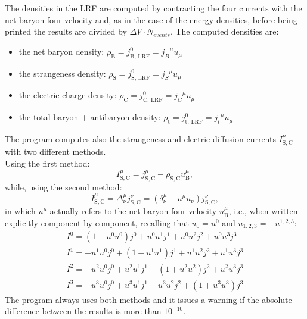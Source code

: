 \documentclass[12pt, a4paper]{article}
\begin{document}
The densities in the LRF are computed by contracting the four currents with the net baryon four-velocity and, as in the case of the energy densities, before being printed the results are divided by $\Delta V \cdot N_{events}$. The computed densities are:
\begin{itemize}
	\item the net baryon density: $\rho_{\mathrm{B}} = j_{\mathrm{B,\,LRF}}^{0}={j_{B}}^{\mu}u_{\mu}$
    \item the strangeness density: $\rho_{\mathrm{S}} = j_{\mathrm{S,\,LRF}}^{0}={j_{S}}^{\mu}u_{\mu}$
    \item the electric charge density: $\rho_{\mathrm{C}} = j_{\mathrm{C,\,LRF}}^{0}={j_{C}}^{\mu}u_{\mu}$
    \item the total baryon + antibaryon density: $\rho_{\mathrm{t}} = j_{\mathrm{t,\,LRF}}^{0}={j_{t}}^{\mu}u_{\mu}$  
\end{itemize}
The program computes also the strangeness and electric diffusion currents $I_{\mathrm{S,C}}^{\mu}$ with two different methods.\\
Using the first method:
\begin{equation}
I_{\mathrm{S,C}}^{\mu}=j_{\mathrm{S,C}}^{\mu}-\rho_{\mathrm{S,C}} u_{\mathrm{B}}^{\mu},
\label{eq:diff_current_eckart_I}
\end{equation}
while, using the second method:
\begin{equation}
I_{\mathrm{S,C}}^{\mu}=\Delta^{\mu}_{\nu}j_{\mathrm{S,C}}^{\nu}=(\delta^{\mu}_{\nu}-u^{\mu}u_{\nu})j_{\mathrm{S,C}}^{\nu},
\label{eq:diff_current_eckart_II}
\end{equation}
in which $u^{\mu}$ actually refers to the net baryon four velocity $u^{\mu}_{\mathrm{B}}$, i.e., when written explicitly component by component, recalling that $u_0=u^0$ and $u_{1,2,3}=-u^{1,2,3}$:
\begin{equation}
\begin{split}
I^0=(1-u^0 u^0)j^0+u^0u^1j^1+u^0u^2j^2+u^0u^3j^3\\
I^1=-u^1 u^0j^0+(1+u^1u^1)j^1+u^1u^2j^2+u^1u^3j^3\\
I^2=-u^2 u^0j^0+u^2u^1j^1+(1+u^2u^2)j^2+u^2u^3j^3\\
I^3=-u^3 u^0j^0+u^3u^1j^1+u^3u^2j^2+(1+u^3u^3)j^3
\end{split}
\label{eq:diff_current_eckart_II_explicit}
\end{equation}
The program always uses both methods and it issues a warning if the absolute difference between the results is more than $10^{-10}$.
\end{document}
